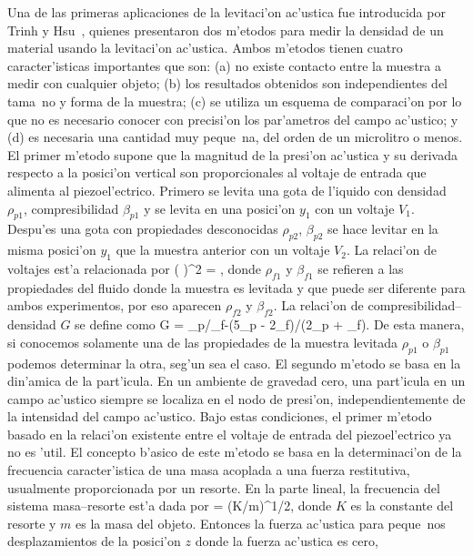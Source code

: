 Una de las primeras aplicaciones de la levitaci'on ac'ustica fue introducida por
Trinh y Hsu~\cite{trinh86}, quienes presentaron dos m'etodos para medir la densidad de un material usando 
la levitaci'on ac'ustica. Ambos  m'etodos tienen cuatro caracter'isticas importantes que son: (a) no existe
contacto entre la muestra a medir con cualquier objeto; (b) los resultados obtenidos son independientes
del tama~no y forma de la muestra; (c) se utiliza un esquema de comparaci'on por lo que no es necesario
conocer con precisi'on los par'ametros del campo ac'ustico; y (d) es necesaria una cantidad muy peque~na,
del orden de un microlitro o menos. El primer m'etodo supone que la magnitud de la presi'on ac'ustica y
su derivada respecto a la posici'on vertical son proporcionales al voltaje de entrada que alimenta al
piezoel'ectrico. Primero se levita una gota de l'iquido con densidad $\rho_{p1}$, compresibilidad $\beta_{p1}$
y se levita en una posici'on $y_1$ con un voltaje $V_1$. Despu'es una gota con propiedades desconocidas
$\rho_{p2}$, $\beta_{p2}$ se hace levitar en la misma posici'on $y_1$ que la muestra anterior con un voltaje  
$V_2$. La relaci'on de voltajes est'a relacionada por
\BE
\left( \right)^2 =  
,
\EE
donde $\rho_{f1}$ y $\beta_{f1}$ se refieren a las propiedades del fluido donde la muestra
es levitada y que puede ser diferente para ambos experimentos, por eso
aparecen $\rho_{f2}$ y $\beta_{f2}$. La relaci'on de compresibilidad--densidad $G$ se define como
\BE
G =
{\beta_p/\beta_f-(5\rho_p - 2\rho_f)/(2\rho_p + \rho_f)}.
\EE 
De esta manera, si conocemos solamente una de las propiedades de la muestra levitada $\rho_{p1}$ o 
$\beta_{p1}$ podemos determinar la otra, seg'un sea el caso. El segundo m'etodo se basa en la din'amica
de la part'icula. En un ambiente de gravedad cero, una part'icula en un campo ac'ustico siempre se localiza
en el nodo de presi'on, independientemente de la intensidad del campo ac'ustico. Bajo estas condiciones, el primer
m'etodo basado en la relaci'on existente entre el voltaje de entrada del piezoel'ectrico ya no es 'util. El
concepto b'asico de este m'etodo se basa en la determinaci'on de la frecuencia  caracter'istica
de una masa acoplada a una fuerza restitutiva, usualmente proporcionada por un resorte. En la parte
lineal, la frecuencia  del sistema masa--resorte est'a dada por
\BE
\omega = (K/m)^{1/2},
\EE 
donde $K$ es la constante del resorte y $m$ es la masa del objeto. 
Entonces la fuerza ac'ustica para peque~nos desplazamientos de la posici'on $z$ donde la fuerza ac'ustica es cero, 
